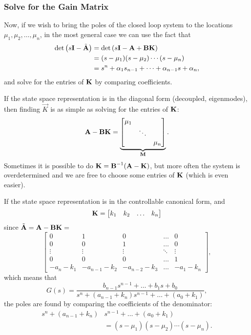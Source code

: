 \subsubsection{Solve for the Gain Matrix}

Now, if we wish to bring the poles of the closed loop system to the locations \(\mu_1, \mu_2, \ldots, \mu_n\), in the most general case we can use the fact that
\begin{align*}
	\det\left(s\bm{\mathrm{I}} - \tilde{\bm{\mathrm{A}}}\right)
		&= \det\left(s\bm{\mathrm{I}} - \bm{\mathrm{A}} + \bm{\mathrm{B}}\bm{\mathrm{K}}\right) \\
		&= (s - \mu_1)(s - \mu_2) \cdots (s - \mu_n) \\
		&= s^n + \alpha_1 s_{n-1} + \dots + \alpha_{n-1} s + \alpha_n,
\end{align*}
and solve for the entries of \(\bm{\mathrm{K}}\) by comparing coefficients.

If the state space representation is in the diagonal form (decoupled, eigenmodes), then finding \(\vec{K}\) is as simple as solving for the entries of \(\bm{\mathrm{K}}\):
\[
	\bm{\mathrm{A}} - \bm{\mathrm{B}} \bm{\mathrm{K}} =
	\underbrace{
		\begin{bmatrix}
			\mu_1 \\
			& \ddots \\
			& & \mu_n
		\end{bmatrix}
	}_{\bm{\mathrm{M}}}.
\]
Sometimes it is possible to do \(\bm{\mathrm{K}} = \bm{\mathrm{B}}^{-1} (\bm{\mathrm{A}} - \bm{\mathrm{K}})\), but more often the system is overdetermined and we are free to choose some entries of \(\bm{\mathrm{K}}\) (which is even easier).

If the state space representation is in the controllable canonical form, and 
\[
	\bm{\mathrm{K}} = \begin{bmatrix} k_1 & k_2 & \ldots & k_n \end{bmatrix}
\]
since \(\tilde{\bm{\mathrm{A}}} = \bm{\mathrm{A}} - \bm{\mathrm{B}}\bm{\mathrm{K}} = \)
{\small
	\[
		\begin{bmatrix}
			0 & 1 & 0 & \dots & 0 \\
			0 & 0 & 1 & \dots & 0 \\
			\vdots & \vdots & \vdots & \ddots & \vdots \\
			0 & 0 & 0 & \dots & 1 \\
			-a_n -k_1 & -a_{n-1} - k_2 & -a_{n-2} - k_3& \dots & -a_1 - k_n
		\end{bmatrix},
	\]
}
which means that
\[
	G(s) = \frac{
		b_{n-1} s^{n-1} + \dots + b_1 s + b_0
	}{
		s^n + (a_{n-1} + k_n) s^{n-1} + \dots + (a_0 + k_1)
	},
\]
the poles are found by comparing the coefficients of the denominator:
\begin{align*}
	s^n + (a_{n-1} + k_n) &s^{n-1} + \dots + (a_0 + k_1) \\
		&= (s - \mu_1)(s - \mu_2) \cdots (s - \mu_n).
\end{align*}

